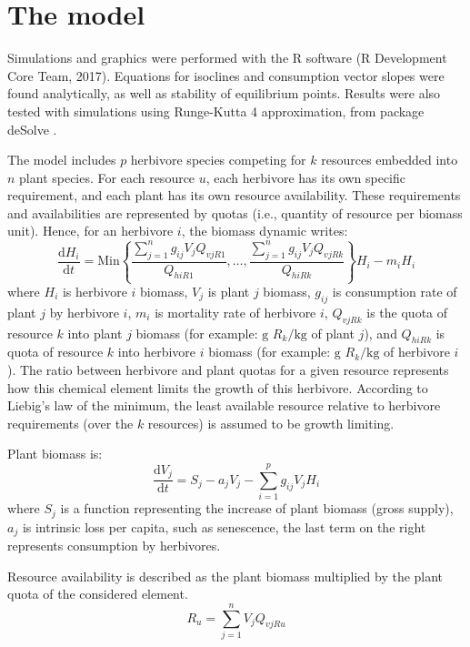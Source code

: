 \documentclass[12pt]{article}
\newcommand\equa[1]{\frac{\mathrm{d}#1}{\mathrm{d}t}}
\begin{document}

\section*{The model}
Simulations and graphics were performed with the R software (R Development Core Team, 2017). Equations for isoclines and consumption vector slopes were found analytically, as well as stability of equilibrium points. Results were also tested with simulations using Runge-Kutta 4 approximation, from package deSolve \citep{Soetaert2010}. 

The model includes $p$ herbivore species competing for $k$ resources embedded into $n$ plant species. For each resource $u$, each herbivore has its own specific requirement, and each plant has %
its own resource availability. These requirements and availabilities are represented by quotas (i.e., quantity of resource per biomass unit). Hence, for an herbivore $i$, the biomass dynamic writes:
\begin{equation}\label{equaherbivoregeneral}
\equa{H_i}=  \mathrm{Min} \left \lbrace \frac{\displaystyle \sum ^n _{j=1} g_{ij} V_j Q_{vjR1}}{Q_{hiR1}}, \ldots,  \frac{\displaystyle \sum ^n _{j=1} g_{ij} V_j Q_{vjRk}}{Q_{hiRk}} \right \rbrace H_i -m_i H_i
\end{equation}
where $H_i$ is herbivore $i$ biomass, $V_j$ is plant $j$ biomass, $g_{ij}$ is consumption rate of plant $j$ by herbivore $i$, $m_i$ is mortality rate of herbivore $i$, $Q_{vjRk}$ is the quota of resource $k$ into plant $j$ biomass (for example: $\text{g }R_k \text{/kg}$ of plant $j$), and $Q_{hiRk}$ is quota of resource $k$ into herbivore $i$ biomass (for example: $\text{g }R_k \text{/kg}$ of herbivore $i$). The ratio between herbivore and plant quotas for a given resource represents how this chemical element limits the growth of this herbivore. According to Liebig's law of the minimum, the least available resource relative to herbivore requirements (over the $k$ resources) is assumed to be growth limiting. \par
Plant biomass is:
\begin{equation}\label{equaplantgeneral}
\equa{V_j}=S_j-a_jV_j-\sum ^p _{i=1} g_{ij}V_jH_i
\end{equation}
where $S_j$ is a function representing the increase of plant biomass (gross supply), $a_j$ is intrinsic loss per capita, such as senescence, the last term on the right represents consumption by herbivores. \par
Resource availability is described as the plant biomass multiplied by the plant quota of the considered element.
\begin{equation} \label{equaresourcegeneral}
R_u=\sum ^n _{j=1} V_jQ_{vjRu}
\end{equation}
\end{document}
